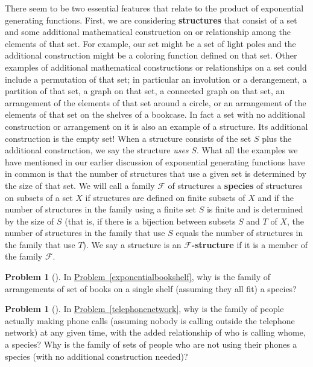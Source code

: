 \documentclass[10pt,]{book}
\newcommand{\terminology}[1]{\textbf{#1}}
\theoremstyle{plain}
\theoremstyle{definition}
\newtheorem{activity}[project]{Problem}
\theoremstyle{definition}
\numberwithin{equation}{chapter}
\newcommand{\F}{\mathcal{F}}
\begin{document}
There seem to be two essential features that relate to the product of exponential generating functions. First, we are considering \terminology{structures} that consist of a set and some additional mathematical construction on or relationship among the elements of that set. For example, our set might be a set of light poles and the additional construction might be a coloring function defined on that set. Other examples of additional mathematical constructions or relationships on a set could include a permutation of that set; in particular an involution or a derangement, a partition of that set, a graph on that set, a connected graph on that set, an arrangement of the elements of that set around a circle, or an arrangement of the elements of that set on the shelves of a bookcase. In fact a set with no additional construction or arrangement on it is also an example of a structure. Its additional construction is the empty set!  When a structure consists of the set \(S\) plus the additional construction, we say the structure \emph{uses} \(S\). What all the examples we have mentioned in our earlier discussion of exponential generating functions have in common is that the number of structures that use a given set is determined by the size of that set. We will call a family \(\F\) of structures a \terminology{species} of structures on subsets of a set \(X\) if structures are defined on finite subsets of \(X\) and if the number of structures in the family using a finite set \(S\) is finite and is determined by the size of \(S\) (that is, if there is a bijection between subsets \(S\) and \(T\) of \(X\), the number of structures in the family that use \(S\) equals the number of structures in the family that use \(T\)). We say a structure is an \terminology{\(\F\)-structure} if it is a member of the family \(\F\).%
\begin{activity}[] \label{activity-394}
\hypertarget{p-2117}{}%
In \hyperref[exponentialbookshelf]{Problem~\ref{exponentialbookshelf}}, why is the family of arrangements of set of books on a single shelf (assuming they all fit) a species?%
\end{activity}
\begin{activity}[] \label{activity-395}
\hypertarget{p-2119}{}%
In \hyperref[telephonenetwork]{Problem~\ref{telephonenetwork}}, why is the family of people actually making phone calls (assuming nobody is calling outside the telephone network) at any given time, with the added relationship of who is calling whome, a species? Why is the family of sets of people who are not using their phones a species (with no additional construction needed)?%
\end{activity}
\end{document}
